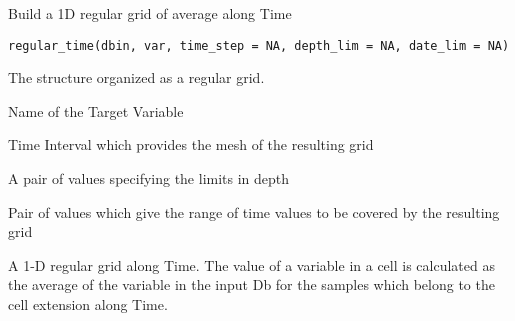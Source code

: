 %
\begin{Description}\relax
Build a 1D regular grid of average along Time
\end{Description}
%
\begin{Usage}
\begin{verbatim}
regular_time(dbin, var, time_step = NA, depth_lim = NA, date_lim = NA)
\end{verbatim}
\end{Usage}
%
\begin{Arguments}
\begin{ldescription}
\item[\code{dbin}] 
The  structure organized as a regular grid.

\item[\code{var}] 
Name of the Target Variable

\item[\code{time\_step}] 
Time Interval which provides the mesh of the resulting grid

\item[\code{depth\_lim}] 
A pair of values specifying the limits in depth

\item[\code{date\_lim}] 
Pair of values which give the range of time values to be covered by
the resulting grid

\end{ldescription}
\end{Arguments}
%
\begin{Value}
A 1-D regular grid along Time. The value of a variable in a cell is calculated
as the average of the variable in the input Db for the samples which belong to
the cell extension along Time.
\end{Value}
